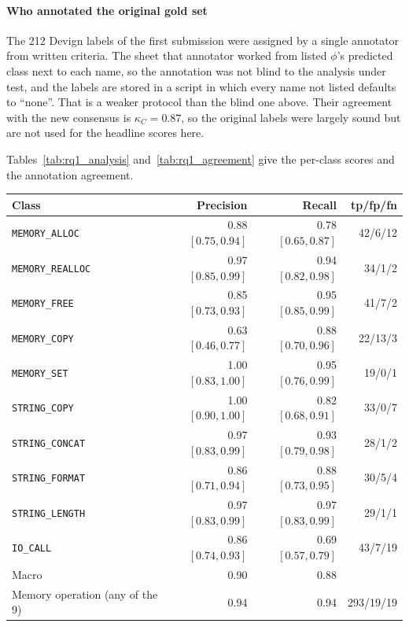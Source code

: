 \documentclass[pdflatex,sn-basic]{sn-jnl}
\let\toprule\hline\let\midrule\hline\let\bottomrule\hline\let\botrule\hline
\theoremstyle{thmstyleone}%
\newcommand{\numdevignOrigKappa}{0.87}
\begin{document}
\paragraph{Who annotated the original gold set} The 212 Devign labels of the
first submission were assigned by a single annotator from written criteria. The sheet
that annotator worked from listed $\phi$'s predicted class next to each name,
so the annotation was not blind to the analysis under test, and the labels are
stored in a script in which every name not listed defaults to ``none''. That
is a weaker protocol than the blind one above.
Their agreement with the new consensus is $\kappa_C=\numdevignOrigKappa$,
so the original labels were largely sound but are not used for the headline
scores here.

Tables~\ref{tab:rq1_analysis} and~\ref{tab:rq1_agreement} give the per-class
scores and the annotation agreement.


\begin{tableorg}[t]
\centering
\caption{RQ1: $\phi$ as a static analysis, scored against the consensus of two
blind annotators and a third pass on disagreements, pooled over the three
corpora. Brackets are 95\% Wilson intervals; tp/fp/fn are counts of distinct
callee names. The last row scores the question $\phi_8$ actually answers
(memory or string operation vs. not).}
\label{tab:rq1_analysis}
\begin{tabular}{lrrr}
\toprule
Class & Precision & Recall & tp/fp/fn \\
\midrule
\texttt{MEMORY\_ALLOC} & 0.88 $[0.75,0.94]$ & 0.78 $[0.65,0.87]$ & 42/6/12 \\
\texttt{MEMORY\_REALLOC} & 0.97 $[0.85,0.99]$ & 0.94 $[0.82,0.98]$ & 34/1/2 \\
\texttt{MEMORY\_FREE} & 0.85 $[0.73,0.93]$ & 0.95 $[0.85,0.99]$ & 41/7/2 \\
\texttt{MEMORY\_COPY} & 0.63 $[0.46,0.77]$ & 0.88 $[0.70,0.96]$ & 22/13/3 \\
\texttt{MEMORY\_SET} & 1.00 $[0.83,1.00]$ & 0.95 $[0.76,0.99]$ & 19/0/1 \\
\texttt{STRING\_COPY} & 1.00 $[0.90,1.00]$ & 0.82 $[0.68,0.91]$ & 33/0/7 \\
\texttt{STRING\_CONCAT} & 0.97 $[0.83,0.99]$ & 0.93 $[0.79,0.98]$ & 28/1/2 \\
\texttt{STRING\_FORMAT} & 0.86 $[0.71,0.94]$ & 0.88 $[0.73,0.95]$ & 30/5/4 \\
\texttt{STRING\_LENGTH} & 0.97 $[0.83,0.99]$ & 0.97 $[0.83,0.99]$ & 29/1/1 \\
\texttt{IO\_CALL} & 0.86 $[0.74,0.93]$ & 0.69 $[0.57,0.79]$ & 43/7/19 \\
\midrule
Macro & 0.90 & 0.88 & \\
Memory operation (any of the 9) & 0.94 & 0.94 & 293/19/19 \\
\bottomrule
\end{tabular}
\end{tableorg}
\end{document}
